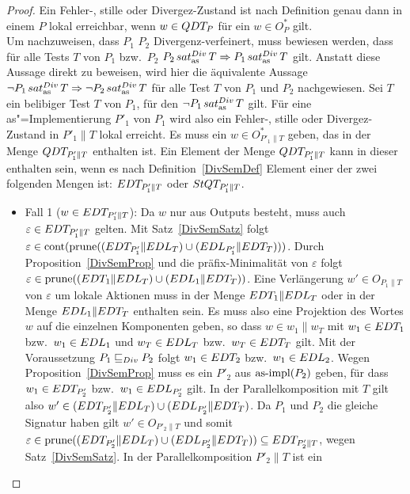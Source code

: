 \begin{proof}
  Ein Fehler-, stille oder Divergez-Zustand ist nach Definition genau dann in
  einem \MEIO{} $P$ lokal erreichbar, wenn $w\in QDT _P$ für ein $w\in O_P^*$
  gilt.\\
  Um nachzuweisen, dass $P_1$ $P_2$ Divergenz-verfeinert, muss bewiesen werden,
  dass für alle Tests $T$ von $P_1$ bzw.\ $P_2$ $P_2\hspace{0.05cm}sat_\mathrm{as}^{Div}\hspace{0.05cm} T \Rightarrow P_1
  \hspace{0.05cm}sat_\mathrm{as}^{Div}\hspace{0.05cm} T$ gilt. Anstatt diese Aussage direkt zu beweisen, wird hier die
  äquivalente Aussage $\neg P_1\hspace{0.05cm}sat_\mathrm{as}^{Div}\hspace{0.05cm} T\Rightarrow\neg P_2\hspace{0.05cm}sat_\mathrm{as}^{Div}\hspace{0.05cm} T$ für alle
  Test $T$ von $P_1$ und $P_2$ nachgewiesen. Sei $T$ ein belibiger Test $T$ von
  $P_1$, für den $\neg P_1\hspace{0.05cm}sat_\mathrm{as}^{Div}\hspace{0.05cm} T$ gilt. Für eine as"=Implementierung $P'_1$
  von $P_1$ wird also ein Fehler-, stille oder Divergez-Zustand in $P'_1\|T$
  lokal erreicht. Es muss ein $w\in O_{P'_1\|T}^*$ geben, das in der Menge
  $QDT _{P'_1\|T}$ enthalten ist. Ein Element der Menge $QDT _{P'_1\|T}$ kann
  in dieser enthalten sein, wenn es nach Definition~\ref{DivSemDef} Element
  einer der zwei folgenden Mengen ist: $EDT _{P'_1\|T}$ oder $StQT _{P'_1\|T}$.
  \begin{itemize}
    \item Fall 1 ($w\in EDT _{P'_1\|T}$): Da $w$ nur aus Outputs besteht, muss
      auch $\varepsilon\in EDT _{P'_1\|T}$ gelten. Mit Satz~\ref{DivSemSatz}
      folgt $\varepsilon\in\mathrm{cont} (\mathrm{prune} ((EDT _{P'_1}\|EDL _T)\cup (EDL
      _{P'_1}\|EDT _T)))$. Durch Proposition~\ref{DivSemProp} und die
      präfix-Minimalität von $\varepsilon$ folgt $\varepsilon\in\mathrm{prune} ((EDT
      _1\|EDL _T)\cup (EDL _1\|EDT _T))$. Eine Verlängerung $w'\in
      O_{P_1\|T}$ von $\varepsilon$ um lokale Aktionen muss in der Menge $EDT
      _1\|EDL _T$ oder in der Menge $EDL _1\|EDT _T$ enthalten sein. Es muss
      also eine Projektion des Wortes $w$ auf die einzelnen Komponenten geben,
      so dass $w\in w_1\|w_T$ mit $w_1\in EDT _1$ bzw.\ $w_1\in EDL _1$ und
      $w_T\in EDL _T$ bzw.\ $w_T\in EDT _T$ gilt. Mit der Voraussetzung $P_1
       \sqsubseteq  _{Div} P_2$ folgt $w_1\in EDT _2$ bzw.\ $w_1\in EDL _2$. Wegen
      Proposition~\ref{DivSemProp} muss es ein $P'_2$ aus $\mathrm{as}\text{-}\mathrm{impl} (P_2)$ geben,
      für dass $w_1\in EDT _{P'_2}$ bzw.\ $w_1\in EDL _{P'_2}$ gilt. In der
      Parallelkomposition mit $T$ gilt also $w'\in (EDT _{P'_2}\|EDL _T)\cup
      (EDL _{P'_2}\|EDT _T)$. Da $P_1$ und $P_2$ die gleiche Signatur haben
      gilt $w'\in O _{P'_2\|T}$ und somit $\varepsilon\in\mathrm{prune} ((EDT
      _{P'_2}\|EDL _T)\cup (EDL _{P'_2}\|EDT _T))\subseteq EDT _{P'_2\|T}$,
      wegen Satz~\ref{DivSemSatz}. In der Parallelkomposition $P'_2\|T$ ist ein

\end{itemize}
\end{proof}
